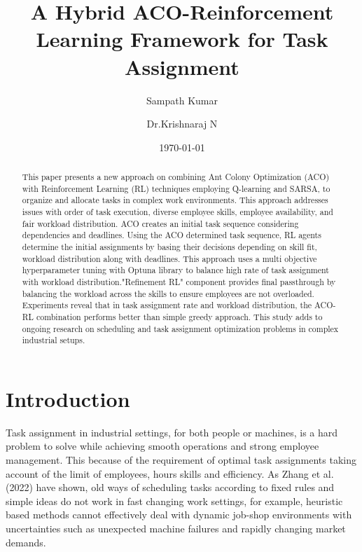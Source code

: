 \documentclass[%
aip,
cp,  %
amsmath,amssymb,
reprint,%
]{revtex4-2}
\begin{document}
	
	\title{A Hybrid ACO-Reinforcement Learning Framework for Task Assignment}
	
	\author{Sampath Kumar}
	
	\author{Dr.Krishnaraj N}
	
	\date{\today}
	
	\begin{abstract}
		This paper presents a new approach on combining Ant Colony Optimization (ACO)
		with Reinforcement Learning (RL) techniques employing Q-learning and SARSA,
		to organize and allocate tasks in complex work environments. This approach addresses
		issues with order of task execution, diverse employee skills, employee availability,
		and fair workload distribution. ACO creates an initial task sequence considering
		dependencies and deadlines. Using the ACO determined task sequence, RL agents
		determine the initial assignments by basing their decisions depending on skill
		fit, workload distribution along with deadlines. This approach uses a multi objective
		hyperparameter tuning with Optuna library to balance high rate of task assignment
		with workload distribution."Refinement RL" component provides final passthrough
		by balancing the workload across the skills to ensure employees are not overloaded.
		Experiments reveal that in task assignment rate and workload distribution, the
		ACO-RL combination performs better than simple greedy approach. This study
		adds to ongoing research on scheduling and task assignment optimization
		problems in complex industrial setups.
	\end{abstract}
	
	
	\maketitle
	
	\section{\label{sec:intro}Introduction}
	Task assignment in industrial settings, for both people or machines, is a hard
	problem to solve while achieving smooth operations and strong employee management.
	This because of the requirement of optimal task assignments taking account of the limit of employees, hours skills and  efficiency. As Zhang et al. (2022) have shown, old ways of scheduling tasks according to fixed rules and simple ideas do not work in fast changing work settings, for example, heuristic based methods cannot effectively deal with dynamic job-shop environments with uncertainties such as unexpected machine failures and rapidly changing market demands\cite{zhang2022, li2024}.
	
\end{document}
